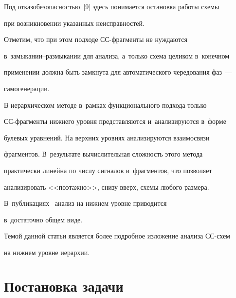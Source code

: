    


   Под отказобезопасностью~[9] здесь понимается остановка работы схемы 


при возникновении указанных неисправностей.


   


   Отметим, что при этом подходе СС-фраг\-мен\-ты не нуждаются 


в~замыкании--раз\-мы\-ка\-нии для анализа, а~только схема целиком в~конечном 


применении должна быть замкнута для автоматического чередования фаз~--- 


самогенерации.


   


   В иерархическом методе в~рамках функционального подхода только  


СС-фраг\-мен\-ты нижнего уровня представляются и~анализируются в~форме 


булевых уравнений. На верхних уровнях анализируются взаимосвязи 


фрагментов. В~результате вычислительная сложность этого метода 


практически линейна по числу сигналов и~фрагментов, что позволяет 


анализировать <<поэтажно>>, снизу вверх, схемы любого размера. 


В~публикациях~\cite{7-pl, 8-pl} анализ на нижнем уровне приводится 


в~достаточно общем виде.


   


   Темой данной статьи является более подробное изложение анализа СС-схем 


на нижнем уровне иерархии.





\vspace*{-4pt}


   


\section{Постановка задачи}





\vspace*{-2pt}


